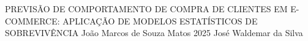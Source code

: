 \documentclass[12pt,openright]{paper}
\begin{document}
\capa
{PREVISÃO DE COMPORTAMENTO DE COMPRA DE CLIENTES EM E-COMMERCE: APLICAÇÃO DE MODELOS ESTATÍSTICOS DE SOBREVIVÊNCIA}
{João Marcos de Souza Matos} %
{2025}
{José Waldemar da Silva} %
% 
% 
% 
\onehalfspacing
\clearpage
{}
\pagestyle{cabecalhorodape}

\tableofcontents
\thispagestyle{empty}
\cleardoublepage

\listoffigures
\cleardoublepage

\listoftables
\cleardoublepage






\newpage
\def\thispagestyle#1{}
\end{document}
